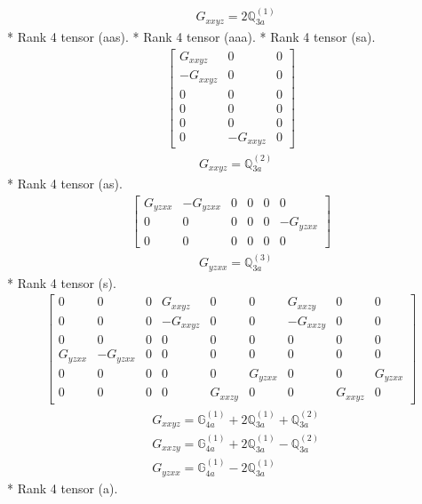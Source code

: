 \documentclass[fleqn,8pt,landscape]{jsarticle}
\begin{document}
\begin{align*}
& G_{xxyz} = 2 \mathbb{Q}_{3a}^{(1)}
\end{align*}
* Rank 4 tensor (aas).
* Rank 4 tensor (aaa).
* Rank 4 tensor (sa).
\begin{align*}
\begin{bmatrix} G_{xxyz} & 0 & 0 \\ - G_{xxyz} & 0 & 0 \\ 0 & 0 & 0 \\ 0 & 0 & 0 \\ 0 & 0 & 0 \\ 0 & - G_{xxyz} & 0 \end{bmatrix}
\end{align*}
\begin{align*}
& G_{xxyz} = \mathbb{Q}_{3a}^{(2)}
\end{align*}
* Rank 4 tensor (as).
\begin{align*}
\begin{bmatrix} G_{yzxx} & - G_{yzxx} & 0 & 0 & 0 & 0 \\ 0 & 0 & 0 & 0 & 0 & - G_{yzxx} \\ 0 & 0 & 0 & 0 & 0 & 0 \end{bmatrix}
\end{align*}
\begin{align*}
& G_{yzxx} = \mathbb{Q}_{3a}^{(3)}
\end{align*}
* Rank 4 tensor (s).
\begin{align*}
\begin{bmatrix} 0 & 0 & 0 & G_{xxyz} & 0 & 0 & G_{xxzy} & 0 & 0 \\ 0 & 0 & 0 & - G_{xxyz} & 0 & 0 & - G_{xxzy} & 0 & 0 \\ 0 & 0 & 0 & 0 & 0 & 0 & 0 & 0 & 0 \\ G_{yzxx} & - G_{yzxx} & 0 & 0 & 0 & 0 & 0 & 0 & 0 \\ 0 & 0 & 0 & 0 & 0 & G_{yzxx} & 0 & 0 & G_{yzxx} \\ 0 & 0 & 0 & 0 & G_{xxzy} & 0 & 0 & G_{xxyz} & 0 \end{bmatrix}
\end{align*}
\begin{align*}
& G_{xxyz} = \mathbb{G}_{4a}^{(1)} + 2 \mathbb{Q}_{3a}^{(1)} + \mathbb{Q}_{3a}^{(2)} \\
& G_{xxzy} = \mathbb{G}_{4a}^{(1)} + 2 \mathbb{Q}_{3a}^{(1)} - \mathbb{Q}_{3a}^{(2)} \\
& G_{yzxx} = \mathbb{G}_{4a}^{(1)} - 2 \mathbb{Q}_{3a}^{(1)}
\end{align*}
* Rank 4 tensor (a).
\end{document}
